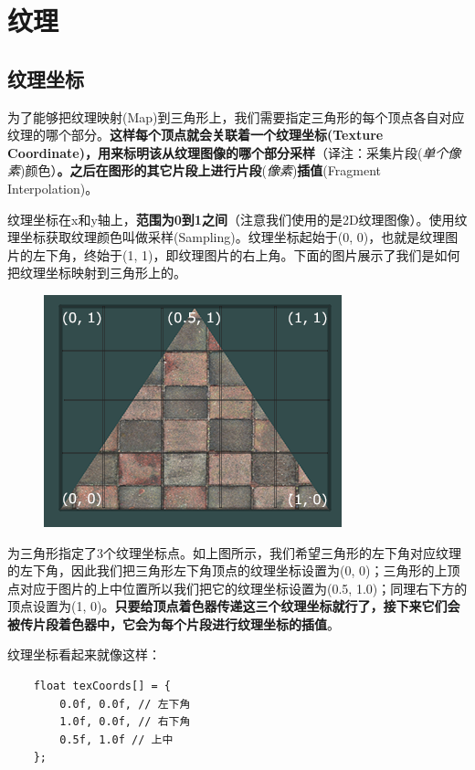 \documentclass[UTF8,a4paper,12pt]{ctexbook}
\begin{document}
		
		
		
		
		
		

	\section{纹理}
		\subsection{纹理坐标}
			为了能够把纹理映射(Map)到三角形上，我们需要指定三角形的每个顶点各自对应纹理的哪个部分。\textbf{这样每个顶点就会关联着一个纹理坐标(Texture Coordinate)，用来标明该从纹理图像的哪个部分采样}（译注：采集片段(\textit{单个像素})颜色）\textbf{。之后在图形的其它片段上进行片段}(\textit{像素})\textbf{插值}(Fragment Interpolation)。
			
			纹理坐标在x和y轴上，\textbf{范围为0到1之间}（注意我们使用的是2D纹理图像）。使用纹理坐标获取纹理颜色叫做采样(Sampling)。纹理坐标起始于(0, 0)，也就是纹理图片的左下角，终始于(1, 1)，即纹理图片的右上角。下面的图片展示了我们是如何把纹理坐标映射到三角形上的。
			
			\begin{figure}[H]
				\centering
				\includegraphics[width=.7\linewidth]{tex_coords}
			\end{figure}
			
			为三角形指定了3个纹理坐标点。如上图所示，我们希望三角形的左下角对应纹理的左下角，因此我们把三角形左下角顶点的纹理坐标设置为(0, 0)；三角形的上顶点对应于图片的上中位置所以我们把它的纹理坐标设置为(0.5, 1.0)；同理右下方的顶点设置为(1, 0)。\textbf{只要给顶点着色器传递这三个纹理坐标就行了，接下来它们会被传片段着色器中，它会为每个片段进行纹理坐标的插值}。
			
			纹理坐标看起来就像这样：
			\begin{lstlisting}
	float texCoords[] = {
	    0.0f, 0.0f, // 左下角
	    1.0f, 0.0f, // 右下角
	    0.5f, 1.0f // 上中
	};		
			\end{lstlisting}
			
\end{document}
